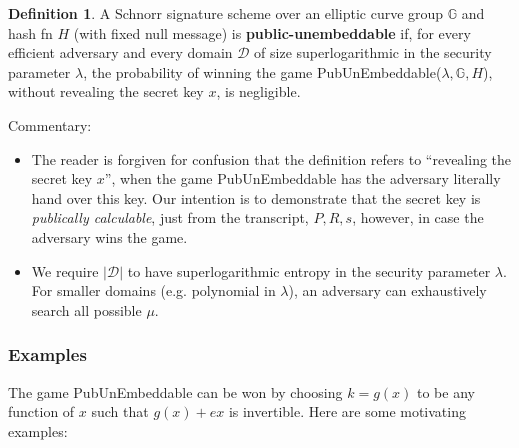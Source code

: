 \documentclass[10pt,a4paper]{article}
\theoremstyle{definition}   %
\newtheorem{definition}{Definition}
\theoremstyle{remark}       %
\newcommand{\G}{\mathbb{G}}
\begin{document}
\begin{definition}
A Schnorr signature scheme over an elliptic curve group $\G$ and hash fn $H$ (with fixed null message) is \textbf{public-unembeddable} if, for every efficient adversary and every domain $\mathcal{D}$ of size superlogarithmic in the security parameter $\lambda$, the probability of winning the game PubUnEmbeddable($\lambda, \G, H$), without revealing the secret key $x$, is negligible.
\end{definition}

Commentary:

\begin{itemize}
\item The reader is forgiven for confusion that the definition refers to ``revealing the secret key $x$'', when the game PubUnEmbeddable has the adversary literally hand over this key. Our intention is to demonstrate that the secret key is \emph{publically calculable}, just from the transcript, $P, R, s$, however, in case the adversary wins the game.
\item We require $|\mathcal{D}|$ to have superlogarithmic entropy in the security parameter $\lambda$. For smaller domains (e.g. polynomial in $\lambda$), an adversary can exhaustively search all possible $\mu$.
\end{itemize}

\subsubsection*{Examples}

The game PubUnEmbeddable can be won by choosing $k = g(x)$ to be any function of $x$ such that $g(x) + ex$ is invertible. Here are some motivating examples:
\end{document}
